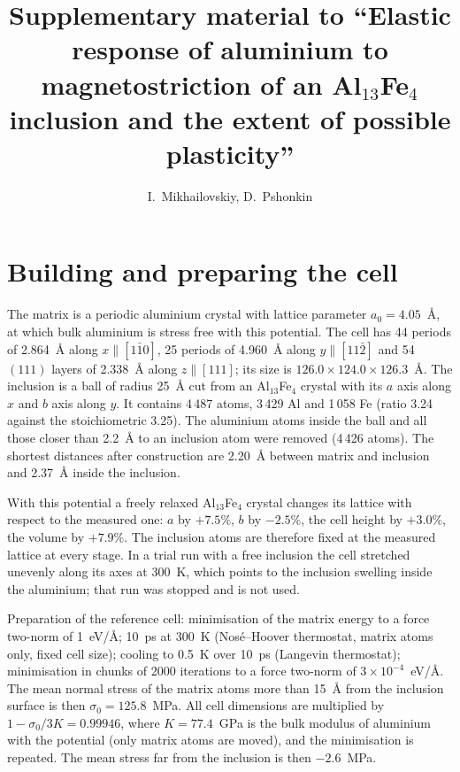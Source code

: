 \documentclass[11pt,a4paper]{article}
\title{Supplementary material to ``Elastic response of aluminium to magnetostriction of an Al$_{13}$Fe$_4$
inclusion and the extent of possible plasticity''}
\author{I.~Mikhailovskiy, D.~Pshonkin}
\date{}
\begin{document}
\maketitle

\section{Building and preparing the cell}

The matrix is a periodic aluminium crystal with lattice parameter
$a_0=4.05$~\AA{}, at which bulk aluminium is stress free with this potential.
The cell has 44 periods of 2.864~\AA{} along $x\parallel[1\bar10]$, 25 periods
of 4.960~\AA{} along $y\parallel[11\bar2]$ and 54 $(111)$ layers of 2.338~\AA{}
along $z\parallel[111]$; its size is $126.0\times124.0\times126.3$~\AA{}. The inclusion is a
ball of radius 25~\AA{} cut from an Al$_{13}$Fe$_4$ crystal with its $a$ axis
along $x$ and $b$ axis along $y$. It contains 4\,487 atoms, 3\,429 Al and
1\,058 Fe (ratio 3.24 against the stoichiometric 3.25). The aluminium atoms
inside the ball and all those closer than 2.2~\AA{} to an inclusion atom were
removed (4\,426 atoms). The shortest distances after construction are
2.20~\AA{} between matrix and inclusion and 2.37~\AA{} inside the inclusion.

With this potential a freely relaxed Al$_{13}$Fe$_4$ crystal changes its
lattice with respect to the measured one: $a$ by $+7.5\%$, $b$ by $-2.5\%$,
the cell height by $+3.0\%$, the volume by $+7.9\%$. The inclusion
atoms are therefore fixed at the measured lattice at every stage. In a trial run with a
free inclusion the cell stretched unevenly along its axes at 300~K, which
points to the inclusion swelling inside the aluminium; that run was stopped
and is not used.

Preparation of the reference cell: minimisation of the matrix energy to a
force two-norm of 1~eV/\AA{}; 10~ps at 300~K (Nos\'e--Hoover thermostat,
matrix atoms only, fixed cell size); cooling to 0.5~K over 10~ps (Langevin
thermostat); minimisation in chunks of 2000 iterations to a force two-norm of
$3\times10^{-4}$~eV/\AA{}. The mean normal stress of the matrix atoms more than
15~\AA{} from the inclusion surface is then $\sigma_0=125.8$~MPa.
All cell dimensions are multiplied by $1-\sigma_0/3K=0.99946$, where
$K=77.4$~GPa is the bulk modulus of aluminium with the potential (only matrix
atoms are moved), and the minimisation is repeated. The mean stress far from
the inclusion is then $-2.6$~MPa.
\end{document}
